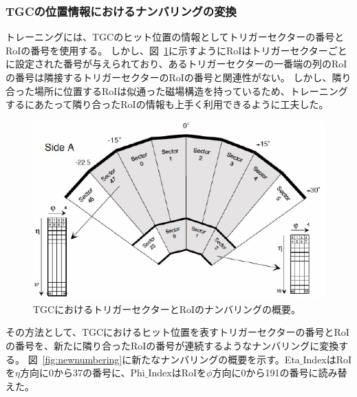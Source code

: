 

\subsubsection{TGCの位置情報におけるナンバリングの変換}
トレーニングには、TGCのヒット位置の情報としてトリガーセクターの番号とRoIの番号を使用する。
しかし、図~\ref{fig:TGCnumbering}に示すようにRoIはトリガーセクターごとに設定された番号が与えられており、あるトリガーセクターの一番端の列のRoIの番号は隣接するトリガーセクターのRoIの番号と関連性がない。
しかし、隣り合った場所に位置するRoIは似通った磁場構造を持っているため、トレーニングするにあたって隣り合ったRoIの情報も上手く利用できるように工夫した。
\begin{figure}[tb]
  \centering
  \includegraphics[clip, width=12cm]{fig/4/TGC_numbering.pdf}
  \caption{TGCにおけるトリガーセクターとRoIのナンバリングの概要\cite{Lellouch:684103}。}
  \label{fig:TGCnumbering}
\end{figure}
その方法として、TGCにおけるヒット位置を表すトリガーセクターの番号とRoIの番号を、新たに隣り合ったRoIの番号が連続するようなナンバリングに変換する。
図~\ref{fig:newnumbering}に新たなナンバリングの概要を示す。Eta$\_$IndexはRoIを$\eta$方向に0から37の番号に、Phi$\_$IndexはRoIを$\phi$方向に0から191の番号に読み替えた。

